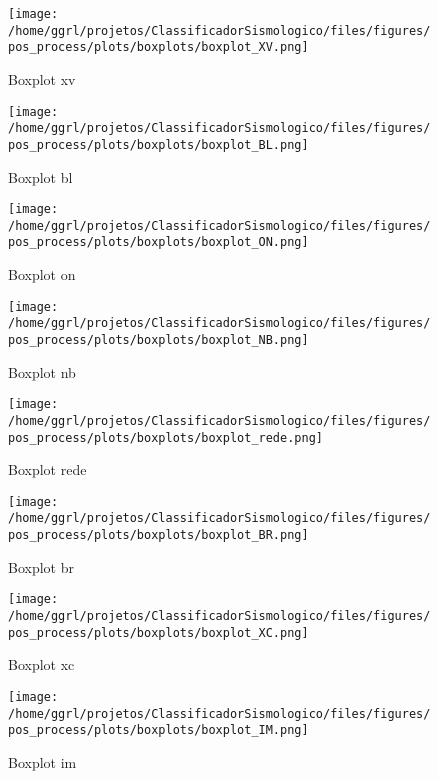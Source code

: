 \begin{figure}[H]
    \centering
    \texttt{[image: /home/ggrl/projetos/ClassificadorSismologico/files/figures/pos\_process/plots/boxplots/boxplot\_XV.png]}
    \caption{Boxplot xv}
    \label{fig:boxplot_XV}
\end{figure}


\begin{figure}[H]
    \centering
    \texttt{[image: /home/ggrl/projetos/ClassificadorSismologico/files/figures/pos\_process/plots/boxplots/boxplot\_BL.png]}
    \caption{Boxplot bl}
    \label{fig:boxplot_BL}
\end{figure}


\begin{figure}[H]
    \centering
    \texttt{[image: /home/ggrl/projetos/ClassificadorSismologico/files/figures/pos\_process/plots/boxplots/boxplot\_ON.png]}
    \caption{Boxplot on}
    \label{fig:boxplot_ON}
\end{figure}


\begin{figure}[H]
    \centering
    \texttt{[image: /home/ggrl/projetos/ClassificadorSismologico/files/figures/pos\_process/plots/boxplots/boxplot\_NB.png]}
    \caption{Boxplot nb}
    \label{fig:boxplot_NB}
\end{figure}


\begin{figure}[H]
    \centering
    \texttt{[image: /home/ggrl/projetos/ClassificadorSismologico/files/figures/pos\_process/plots/boxplots/boxplot\_rede.png]}
    \caption{Boxplot rede}
    \label{fig:boxplot_rede}
\end{figure}


\begin{figure}[H]
    \centering
    \texttt{[image: /home/ggrl/projetos/ClassificadorSismologico/files/figures/pos\_process/plots/boxplots/boxplot\_BR.png]}
    \caption{Boxplot br}
    \label{fig:boxplot_BR}
\end{figure}


\begin{figure}[H]
    \centering
    \texttt{[image: /home/ggrl/projetos/ClassificadorSismologico/files/figures/pos\_process/plots/boxplots/boxplot\_XC.png]}
    \caption{Boxplot xc}
    \label{fig:boxplot_XC}
\end{figure}


\begin{figure}[H]
    \centering
    \texttt{[image: /home/ggrl/projetos/ClassificadorSismologico/files/figures/pos\_process/plots/boxplots/boxplot\_IM.png]}
    \caption{Boxplot im}
    \label{fig:boxplot_IM}
\end{figure}


